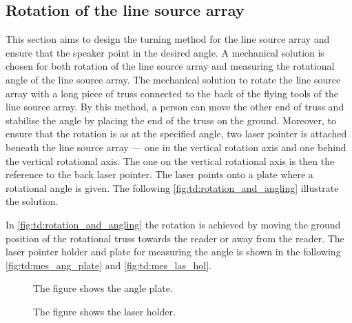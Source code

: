 \subsection{Rotation of the line source array}
This section aims to design the turning method for the line source array and ensure that the speaker point in the desired angle. A mechanical solution is chosen for both rotation of the line source array and measuring the rotational angle of the line source array. The mechanical solution to rotate the line source array with a long piece of truss connected to the back of the flying tools of the line source array. By this method, a person can move the other end of truss and stabilise the angle by placing the end of the truss on the ground. Moreover, to ensure that the rotation is as at the specified angle, two laser pointer is attached beneath the line source array — one in the vertical rotation axis and one behind the vertical rotational axis. The one on the vertical rotational axis is then the reference to the back laser pointer. The laser points onto a plate where a rotational angle is given. The following \autoref{fig:td:rotation_and_angling} illustrate the solution.


In \autoref{fig:td:rotation_and_angling} the rotation is achieved by moving the ground position of the rotational truss towards the reader or away from the reader. The laser pointer holder and plate for measuring the angle is shown in the following \autoref{fig:td:mes_ang_plate} and \autoref{fig:td:mes_las_hol}.


\begin{figure}[H]
    \centering
     \captionsetup{width=1\linewidth}
    \begin{minipage}{0.36\textwidth}
        \centering
         \captionsetup{width=0.90\linewidth}
       
        \caption{The figure shows the angle plate.}
        \label{fig:td:mes_ang_plate}
    \end{minipage}%
    \begin{minipage}{0.56\textwidth}
        \centering
         \captionsetup{width=0.90\linewidth}
        
        \caption{The figure shows the laser holder.}
        \label{fig:td:mes_las_hol}
    \end{minipage}
\end{figure}


